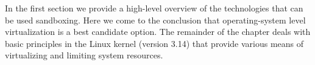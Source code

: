 In the first section we provide a high-level overview of the technologies that
can be used sandboxing. Here we come to the conclusion that operating-system
level virtualization is a best candidate option. The remainder of the chapter
deals with basic principles in the Linux kernel (version 3.14) that provide
various means of virtualizing and limiting system resources.












